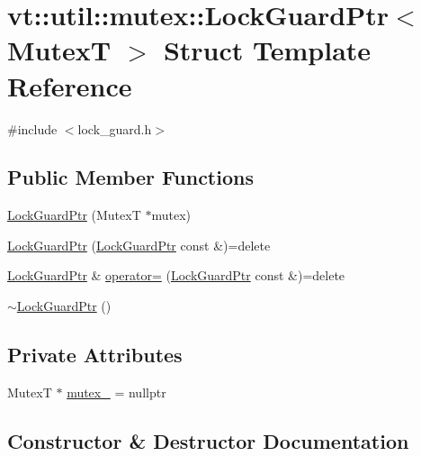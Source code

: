 \hypertarget{structvt_1_1util_1_1mutex_1_1_lock_guard_ptr}{}\section{vt\+:\+:util\+:\+:mutex\+:\+:Lock\+Guard\+Ptr$<$ MutexT $>$ Struct Template Reference}
\label{structvt_1_1util_1_1mutex_1_1_lock_guard_ptr}


{\ttfamily \#include $<$lock\+\_\+guard.\+h$>$}

\subsection*{Public Member Functions}
\begin{DoxyCompactItemize}
\item 
\hyperlink{structvt_1_1util_1_1mutex_1_1_lock_guard_ptr_ae8e65d8b2e5f55621aa91b87da7a0ecb}{Lock\+Guard\+Ptr} (MutexT $\ast$mutex)
\item 
\hyperlink{structvt_1_1util_1_1mutex_1_1_lock_guard_ptr_af12e24d099e69a582ceabd7cd4f77079}{Lock\+Guard\+Ptr} (\hyperlink{structvt_1_1util_1_1mutex_1_1_lock_guard_ptr}{Lock\+Guard\+Ptr} const \&)=delete
\item 
\hyperlink{structvt_1_1util_1_1mutex_1_1_lock_guard_ptr}{Lock\+Guard\+Ptr} \& \hyperlink{structvt_1_1util_1_1mutex_1_1_lock_guard_ptr_a17f01073ff7844fc0215758035ff74fb}{operator=} (\hyperlink{structvt_1_1util_1_1mutex_1_1_lock_guard_ptr}{Lock\+Guard\+Ptr} const \&)=delete
\item 
\hyperlink{structvt_1_1util_1_1mutex_1_1_lock_guard_ptr_af4304427f4783fc57e3fb889d4e64797}{$\sim$\+Lock\+Guard\+Ptr} ()
\end{DoxyCompactItemize}
\subsection*{Private Attributes}
\begin{DoxyCompactItemize}
\item 
MutexT $\ast$ \hyperlink{structvt_1_1util_1_1mutex_1_1_lock_guard_ptr_a305be2f257219435a9f50af1c1ebbac9}{mutex\+\_\+} = nullptr
\end{DoxyCompactItemize}


\subsection{Constructor \& Destructor Documentation}
\mbox{\label{structvt_1_1util_1_1mutex_1_1_lock_guard_ptr_ae8e65d8b2e5f55621aa91b87da7a0ecb}} 
